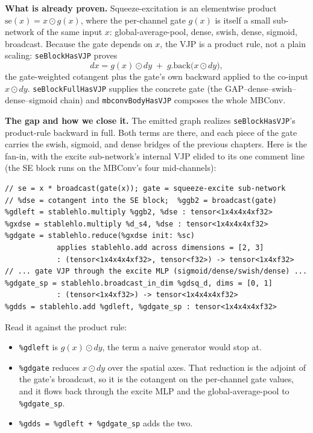 \noindent\textbf{What is already proven.} Squeeze-excitation is an
elementwise product $\mathrm{se}(x) = x \odot g(x)$, where the per-channel
gate $g(x)$ is itself a small sub-network of the same input $x$:
global-average-pool, dense, swish, dense, sigmoid, broadcast. Because the
gate depends on $x$, the VJP is a product rule, not a plain scaling:
\texttt{seBlockHasVJP} proves
\[
  dx = g(x)\odot dy \;+\; g.\mathrm{back}\bigl(x \odot dy\bigr),
\]
the gate-weighted cotangent plus the gate's own backward applied to
the co-input $x\odot dy$. \texttt{seBlockFullHasVJP} supplies the
concrete gate (the GAP--dense--swish--dense--sigmoid chain) and
\texttt{mbconvBodyHasVJP} composes the whole MBConv.

\medskip\noindent\textbf{The gap and how we close it.} The emitted graph
realizes \texttt{seBlockHasVJP}'s product-rule backward in full. Both
terms are there, and each piece of the gate carries the swish, sigmoid, and
dense bridges of the previous chapters. Here is the fan-in, with the excite
sub-network's internal VJP elided to its one comment line (the SE block runs
on the MBConv's four mid-channels):

\begin{verbatim}
// se = x * broadcast(gate(x)); gate = squeeze-excite sub-network
// %dse = cotangent into the SE block;  %ggb2 = broadcast(gate)
%gdleft = stablehlo.multiply %ggb2, %dse : tensor<1x4x4x4xf32>
%gxdse = stablehlo.multiply %d_s4, %dse : tensor<1x4x4x4xf32>
%gdgate = stablehlo.reduce(%gxdse init: %sc)
            applies stablehlo.add across dimensions = [2, 3]
            : (tensor<1x4x4x4xf32>, tensor<f32>) -> tensor<1x4xf32>
// ... gate VJP through the excite MLP (sigmoid/dense/swish/dense) ...
%gdgate_sp = stablehlo.broadcast_in_dim %gdsq_d, dims = [0, 1]
            : (tensor<1x4xf32>) -> tensor<1x4x4x4xf32>
%gdds = stablehlo.add %gdleft, %gdgate_sp : tensor<1x4x4x4xf32>
\end{verbatim}

\noindent Read it against the product rule:

\begin{itemize}
  \item \texttt{\%gdleft} is $g(x)\odot dy$, the term a naive generator
    would stop at.
  \item \texttt{\%gdgate} reduces $x \odot dy$ over the spatial axes. That
    reduction is the adjoint of the gate's broadcast, so it is the
    cotangent on the per-channel gate values, and it flows back through the
    excite MLP and the global-average-pool to \texttt{\%gdgate\_sp}.
  \item \texttt{\%gdds = \%gdleft + \%gdgate\_sp} adds the two.
\end{itemize}

